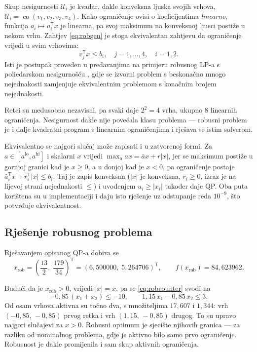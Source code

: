 Skup nesigurnosti $\mathcal{U}_i$ je kvadar, dakle konveksna ljuska svojih
vrhova, $\mathcal{U}_i = \operatorname{co}(v_1, v_2, v_3, v_4)$. Kako ograničenje
ovisi o koeficijentima \emph{linearno}, funkcija $a_i \mapsto a_i^{\mathsf T}x$
je linearna, pa svoj maksimum na konveksnoj ljusci postiže u nekom vrhu.
Zahtjev \eqref{eq:robgen} je stoga ekvivalentan zahtjevu da ograničenje vrijedi
u svim vrhovima:
\begin{equation}
  \boxed{\;v_j^{\mathsf T}x \le b_i, \quad j = 1,\dots,4, \quad i = 1,2 .\;}
  \label{eq:robcounter}
\end{equation}
Isti je postupak proveden u predavanjima na primjeru robusnog LP-a s
poliedarskom nesigurnošću \cite[str.~12--16]{jokic_robusno}, gdje se izvorni
problem s beskonačno mnogo nejednakosti zamjenjuje ekvivalentnim problemom s
konačnim brojem nejednakosti.

Retci su međusobno nezavisni, pa svaki daje $2^2 = 4$ vrha, ukupno $8$ linearnih
ograničenja. Nesigurnost dakle nije povećala klasu problema --- robusni problem
je i dalje kvadratni program s linearnim ograničenjima i rješava se istim
solverom.

Ekvivalentno se najgori slučaj može zapisati i u zatvorenoj formi. Za
$a \in [a^{\text{lo}}, a^{\text{hi}}]$ i skalarni $x$ vrijedi
$\max_a ax = \bar a x + r|x|$, jer se maksimum postiže u gornjoj granici kad je
$x \ge 0$, a u donjoj kad je $x < 0$, pa ograničenje postaje
$\bar a_i^{\mathsf T}x + r_i^{\mathsf T}|x| \le b_i$. Taj je zapis konveksan
($|x|$ je konveksna, $r_i \ge 0$, izraz je na lijevoj strani nejednakosti
$\le$) i uvođenjem $u_i \ge |x_i|$ također daje QP. Oba puta korištena su u
implementaciji i daju isto rješenje uz odstupanje reda $10^{-9}$, što potvrđuje
ekvivalentnost.

\subsection{Rješenje robusnog problema}
\label{sec:zad2:rjesenje}

Rješavanjem opisanog QP-a dobiva se
\begin{equation}
  x_{\text{rob}} = \left(\frac{13}{2},\; \frac{179}{34}\right)^{\!\mathsf T}
                 = (6{,}500000,\; 5{,}264706)^{\mathsf T}, \qquad
  f(x_{\text{rob}}) = 84{,}623962 .
  \label{eq:z2sol}
\end{equation}

Budući da je $x_{\text{rob}} > 0$, vrijedi $|x| = x$, pa se \eqref{eq:robcounter}
svodi na
\begin{equation}
  -0{,}85\,(x_1 + x_2) \le -10, \qquad 1{,}15\,x_1 - 0{,}85\,x_2 \le 3 .
  \label{eq:robexplicit}
\end{equation}
Od osam vrhova aktivna su točno dva, s množiteljima $17{,}607$ i $1{,}344$:
vrh $(-0{,}85,\, -0{,}85)$ prvog retka i vrh $(1{,}15,\, -0{,}85)$ drugog. To su
upravo najgori slučajevi za $x > 0$. Robusni optimum je sjecište njihovih
granica --- za razliku od nominalnog problema, gdje je aktivno bilo samo prvo
ograničenje. Robusnost je dakle promijenila i sam skup aktivnih ograničenja.

